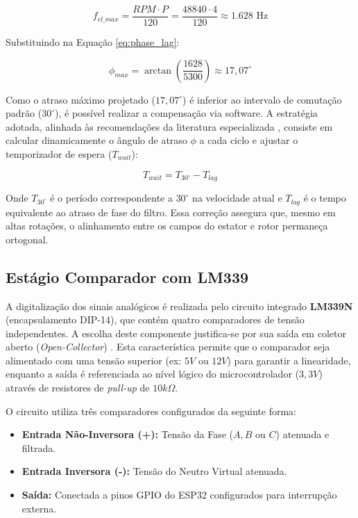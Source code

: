 \documentclass[12pt, a4paper, openright, oneside, brazilian]{abntex2}
\begin{document}
\begin{equation}
    f_{el\_max} = \frac{RPM \cdot P}{120} = \frac{48840 \cdot 4}{120} \approx 1.628 \text{ Hz}
\end{equation}

Substituindo na Equação \ref{eq:phase_lag}:

\begin{equation}
    \phi_{max} = \arctan\left(\frac{1628}{5300}\right) \approx 17,07^{\circ}
\end{equation}

Como o atraso máximo projetado ($17,07^{\circ}$) é inferior ao intervalo de comutação padrão ($30^{\circ}$), é possível realizar a compensação via software. A estratégia adotada, alinhada às recomendações da literatura especializada \cite{ti2013sensorless}, consiste em calcular dinamicamente o ângulo de atraso $\phi$ a cada ciclo e ajustar o temporizador de espera ($T_{wait}$):

\begin{equation}
    T_{wait} = T_{30^{\circ}} - T_{lag}
\end{equation}

\noindent Onde $T_{30^{\circ}}$ é o período correspondente a $30^{\circ}$ na velocidade atual e $T_{lag}$ é o tempo equivalente ao atraso de fase do filtro. Essa correção assegura que, mesmo em altas rotações, o alinhamento entre os campos do estator e rotor permaneça ortogonal.

\subsection{Estágio Comparador com LM339}

A digitalização dos sinais analógicos é realizada pelo circuito integrado \textbf{LM339N} (encapsulamento DIP-14), que contém quatro comparadores de tensão independentes. A escolha deste componente justifica-se por sua saída em coletor aberto (\textit{Open-Collector}) \cite{tiLM339}. Esta característica permite que o comparador seja alimentado com uma tensão superior (ex: $5V$ ou $12V$) para garantir a linearidade, enquanto a saída é referenciada ao nível lógico do microcontrolador ($3,3V$) através de resistores de \textit{pull-up} de $10k\Omega$.

O circuito utiliza três comparadores configurados da seguinte forma:
\begin{itemize}
    \item \textbf{Entrada Não-Inversora (+):} Tensão da Fase ($A, B$ ou $C$) atenuada e filtrada.
    \item \textbf{Entrada Inversora (-):} Tensão do Neutro Virtual atenuada.
    \item \textbf{Saída:} Conectada a pinos GPIO do ESP32 configurados para interrupção externa.
\end{itemize}
\end{document}

